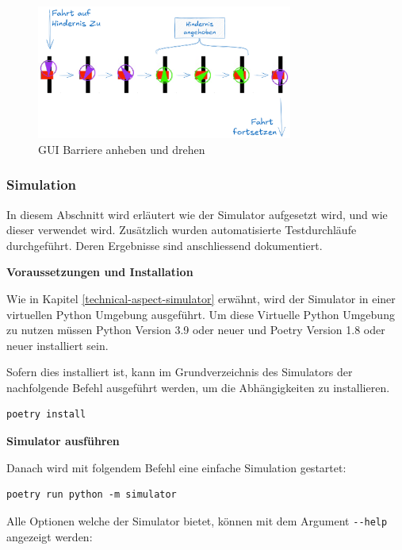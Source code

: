 \begin{figure}[H]
\centering
\includegraphics[width=0.75\textwidth]{assets/informatik-prototyp/simulator/sim-ui-barrier-flow.png}
\caption{GUI Barriere anheben und drehen}
\label{fig:sim-gui-barrier-flow}
\end{figure}



\subsubsection{Simulation}

In diesem Abschnitt wird erläutert wie der Simulator aufgesetzt wird, und wie dieser verwendet wird. Zusätzlich wurden automatisierte Testdurchläufe durchgeführt. Deren Ergebnisse sind anschliessend dokumentiert.

\textbf{Voraussetzungen und Installation}

Wie in Kapitel \ref{technical-aspect-simulator} erwähnt, wird der Simulator in einer virtuellen Python Umgebung ausgeführt. Um diese Virtuelle Python Umgebung zu nutzen müssen Python Version 3.9 oder neuer und Poetry Version 1.8 oder neuer installiert sein.

Sofern dies installiert ist, kann im Grundverzeichnis des Simulators der nachfolgende Befehl ausgeführt werden, um die Abhängigkeiten zu installieren.

\begin{verbatim}
poetry install
\end{verbatim}

\textbf{Simulator ausführen}

Danach wird mit folgendem Befehl eine einfache Simulation gestartet:

\begin{verbatim}
poetry run python -m simulator
\end{verbatim}

Alle Optionen welche der Simulator bietet, können mit dem Argument \verb|--help| angezeigt werden:

